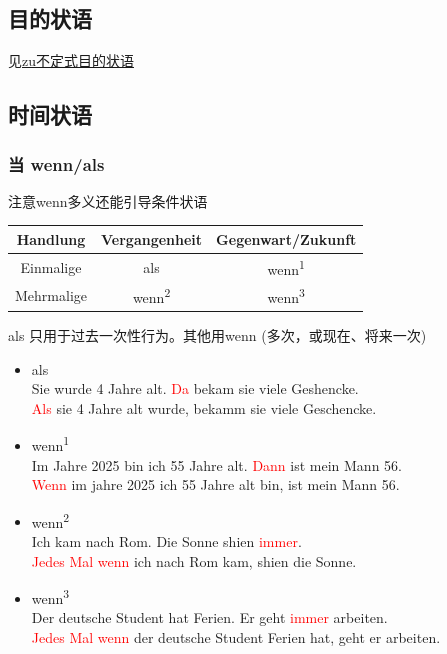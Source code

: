 \subsection{目的状语}
见\hyperref[subsec:zu:final]{zu不定式目的状语}

\subsection{时间状语}

\subsubsection{当 wenn/als}
注意wenn多义还能引导条件状语 \\

\begin{center}
    \begin{tabular}{|c|c|c|}
        \hline
        \rowcolor{gray}
        Handlung   & Vergangenheit           & Gegenwart/Zukunft       \\
        \hline
        Einmalige  & als                     & wenn\textsuperscript{1} \\
        \hline
        Mehrmalige & wenn\textsuperscript{2} & wenn\textsuperscript{3} \\
        \hline
    \end{tabular}
\end{center}

als 只用于过去一次性行为。其他用wenn (多次，或现在、将来一次)

\begin{itemize}
    \item als \\
          Sie wurde 4 Jahre alt. \textcolor{red}{Da} bekam sie viele Geshencke. \\
          \textcolor{red}{Als} sie 4 Jahre alt wurde, bekamm sie viele Geschencke.
    \item wenn\textsuperscript{1} \\
          Im Jahre 2025 bin ich 55 Jahre alt. \textcolor{red}{Dann} ist mein Mann 56. \\
          \textcolor{red}{Wenn} im jahre 2025 ich 55 Jahre alt bin, ist mein Mann 56.
    \item wenn\textsuperscript{2} \\
          Ich kam nach Rom. Die Sonne shien \textcolor{red}{immer}. \\
          \textcolor{red}{Jedes Mal wenn} ich nach Rom kam, shien die Sonne.
    \item wenn\textsuperscript{3} \\
          Der deutsche Student hat Ferien. Er geht \textcolor{red}{immer} arbeiten. \\
          \textcolor{red}{Jedes Mal wenn} der deutsche Student Ferien hat, geht er arbeiten.
\end{itemize}

